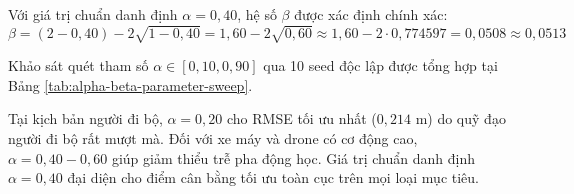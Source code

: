 Với giá trị chuẩn danh định $\alpha = 0{,}40$, hệ số $\beta$ được xác định chính xác:
\begin{equation}
\beta = (2 - 0{,}40) - 2\sqrt{1 - 0{,}40} = 1{,}60 - 2\sqrt{0{,}60} \approx 1{,}60 - 2 \cdot 0{,}774597 = 0{,}0508 \approx 0{,}0513
\label{eq:beta-calculation}
\end{equation}

Khảo sát quét tham số $\alpha \in [0{,}10, 0{,}90]$ qua 10 seed độc lập được tổng hợp tại Bảng \ref{tab:alpha-beta-parameter-sweep}.

\begin{table}[H]
\centering
\caption{Đánh giá độ nhạy RMSE và thời gian hội tụ theo tham số bộ lọc Alpha-Beta}
\label{tab:alpha-beta-parameter-sweep}
\end{table}

Tại kịch bản người đi bộ, $\alpha = 0{,}20$ cho RMSE tối ưu nhất ($0{,}214$ m) do quỹ đạo người đi bộ rất mượt mà. Đối với xe máy và drone có cơ động cao, $\alpha = 0{,}40 - 0{,}60$ giúp giảm thiểu trễ pha động học. Giá trị chuẩn danh định $\alpha = 0{,}40$ đại diện cho điểm cân bằng tối ưu toàn cục trên mọi loại mục tiêu.

